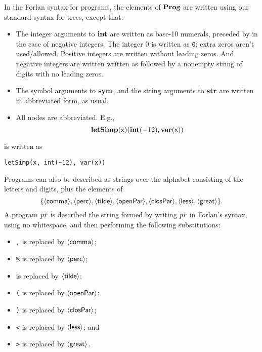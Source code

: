 %
In the Forlan syntax for programs, the elements of $\mathbf{Prog}$ are
written using our standard syntax for trees, except that:
\begin{itemize}
\item The integer arguments to $\mathbf{int}$ are written as base-10 numerals,
  preceded by \texttt{\tildesym} in the case of negative integers.  The
  integer $0$ is written as \texttt{0}; extra zeros aren't used/allowed.
  Positive integers are written without leading zeros. And negative
  integers are written written as \texttt{\tildesym} followed by a nonempty
  string of digits with no leading zeros.

\item The symbol arguments to $\mathbf{sym}$, and the string arguments to
  $\mathbf{str}$ are written in abbreviated form, as usual.

\item All nodes are abbreviated.  E.g.,
  \begin{displaymath}
    \mathbf{letSimp}(\mathsf{x})(\mathbf{int}(-12),\mathbf{var}(\mathsf{x}))
  \end{displaymath}
\end{itemize}
is written as
\begin{verbatim}
letSimp(x, int(~12), var(x))
\end{verbatim}

%
Programs can also be described as strings over the
alphabet consisting of the letters and digits, plus the elements of
\begin{displaymath}
\{{\langle\mathsf{comma}\rangle}, {\langle\mathsf{perc}\rangle}, {\langle\mathsf{tilde}\rangle}, {\langle\mathsf{openPar}\rangle},
{\langle\mathsf{closPar}\rangle}, {\langle\mathsf{less}\rangle}, {\langle\mathsf{great}\rangle}\} .
\end{displaymath}
A program $\mathit{pr}$ is described the string formed by writing $\mathit{pr}$
in Forlan's syntax, using no whitespace, and then performing
the following substitutions:
\begin{itemize}
\item \texttt{,} is replaced by ${\langle\mathsf{comma}\rangle}$;

\item \texttt{\%} is replaced by ${\langle\mathsf{perc}\rangle}$;

\item \texttt{\tildesym} is replaced by ${\langle\mathsf{tilde}\rangle}$;

\item \texttt{(} is replaced by ${\langle\mathsf{openPar}\rangle}$;

\item \texttt{)} is replaced by ${\langle\mathsf{closPar}\rangle}$;

\item \texttt{<} is replaced by ${\langle\mathsf{less}\rangle}$; and

\item \texttt{>} is replaced by ${\langle\mathsf{great}\rangle}$.
\end{itemize}

